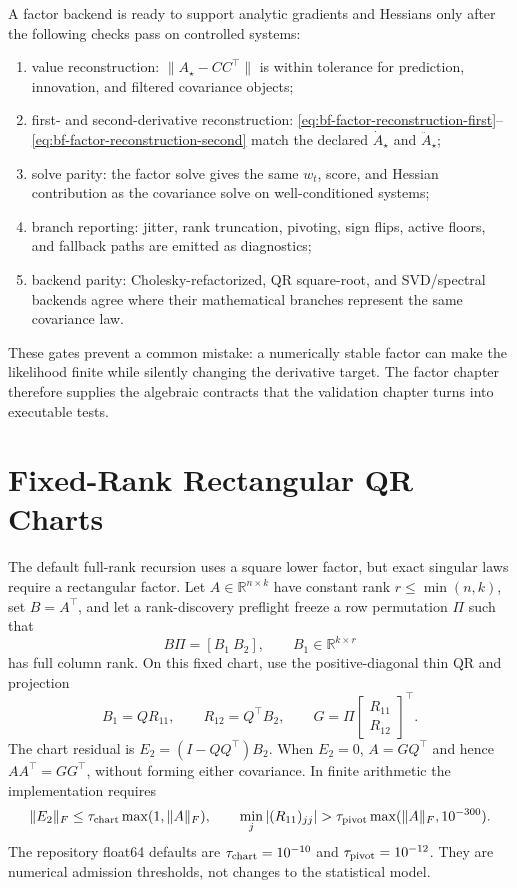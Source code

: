 A factor backend is ready to support analytic gradients and Hessians only after
the following checks pass on controlled systems:
\begin{enumerate}[label=(\roman*)]
  \item value reconstruction:
    $\|A_\star-CC^\top\|$ is within tolerance for prediction, innovation, and
    filtered covariance objects;
  \item first- and second-derivative reconstruction:
    \eqref{eq:bf-factor-reconstruction-first}--\eqref{eq:bf-factor-reconstruction-second}
    match the declared $\dot A_\star$ and $\ddot A_\star$;
  \item solve parity:
    the factor solve gives the same $w_t$, score, and Hessian contribution as
    the covariance solve on well-conditioned systems;
  \item branch reporting:
    jitter, rank truncation, pivoting, sign flips, active floors, and fallback
    paths are emitted as diagnostics;
  \item backend parity:
    Cholesky-refactorized, QR square-root, and SVD/spectral backends agree where
    their mathematical branches represent the same covariance law.
\end{enumerate}
These gates prevent a common mistake: a numerically stable factor can make the
likelihood finite while silently changing the derivative target.  The factor
chapter therefore supplies the algebraic contracts that the validation chapter
turns into executable tests.

\section{Fixed-Rank Rectangular QR Charts}
\label{sec:bf-fixed-rank-rectangular-qr}

The default full-rank recursion uses a square lower factor, but exact singular
laws require a rectangular factor.  Let
\(A\in\mathbb R^{n\times k}\) have constant rank \(r\leq\min(n,k)\), set
\(B=A^\top\), and let a rank-discovery preflight freeze a row permutation
\(\Pi\) such that
\[
  B\Pi=[B_1\ B_2],\qquad B_1\in\mathbb R^{k\times r}
\]
has full column rank.  On this fixed chart, use the positive-diagonal thin QR
and projection
\begin{equation}
\label{eq:bf-rectangular-fixed-chart}
  B_1=QR_{11},\qquad R_{12}=Q^\top B_2,
  \qquad
  G=\Pi
  \begin{bmatrix}R_{11}\\R_{12}\end{bmatrix}^{\!\top}.
\end{equation}
The chart residual is \(E_2=(I-QQ^\top)B_2\).  When \(E_2=0\),
\(A=GQ^\top\) and hence \(AA^\top=GG^\top\), without forming either
covariance.  In finite arithmetic the implementation requires
\[
 \|E_2\|_F\leq \tau_{\rm chart}\max(1,\|A\|_F),\qquad
 \min_j |(R_{11})_{jj}|>
 \tau_{\rm pivot}\max(\|A\|_F,10^{-300}).
\]
The repository float64 defaults are
\(\tau_{\rm chart}=10^{-10}\) and
\(\tau_{\rm pivot}=10^{-12}\).  They are numerical admission thresholds, not
changes to the statistical model.

